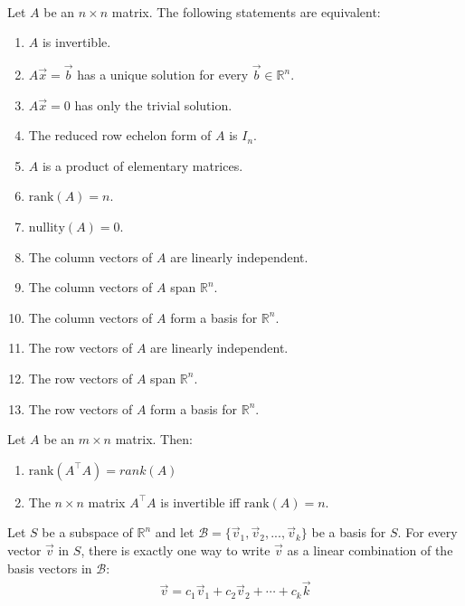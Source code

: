 \documentclass{article}
\begin{document}
\begin{theorem}
    \\
    Let $A$ be an $n\times n$ matrix. The following statements are equivalent:
    \begin{enumerate}
        \item $A$ is invertible.
        \item $A\vec x = \vec b$ has a unique solution for every $\vec b\in\mathbb{R}^n$.
        \item $A\vec x = 0$ has only the trivial solution.
        \item The reduced row echelon form of $A$ is $I_n$.
        \item $A$ is a product of elementary matrices.
        \item $\text{rank}(A)=n$.
        \item $\text{nullity}(A)=0$.
        \item The column vectors of $A$ are linearly independent.
        \item The column vectors of $A$ span $\mathbb{R}^n$.
        \item The column vectors of $A$ form a basis for $\mathbb{R}^n$.
        \item The row vectors of $A$ are linearly independent.
        \item The row vectors of $A$ span $\mathbb{R}^n$.
        \item The row vectors of $A$ form a basis for $\mathbb{R}^n$.
    \end{enumerate}
\end{theorem}
\begin{theorem}
    Let $A$ be an $m\times n$ matrix. Then:
    \begin{enumerate}
        \item $\text{rank}(A^\intercal A) = rank(A)$
        \item The $n\times n$ matrix $A^\intercal A$ is invertible iff $\text{rank}(A)=n$.
    \end{enumerate}
\end{theorem}
\begin{theorem}
    Let $S$ be a subspace of $\mathbb{R}^n$ and let $\mathcal{B}=\{\vec v_1, \vec v_2, ..., \vec v_k\}$ be a basis for $S$. For every vector $\vec v$ in $S$, there is exactly one way to write $\vec v$ as a linear combination of the basis vectors in $\mathcal{B}$:
    \begin{gather*}
        \vec v = c_1\vec v_1 + c_2\vec v_2 + \cdots + c_k\vec k
    \end{gather*}
\end{theorem}
\end{document}

